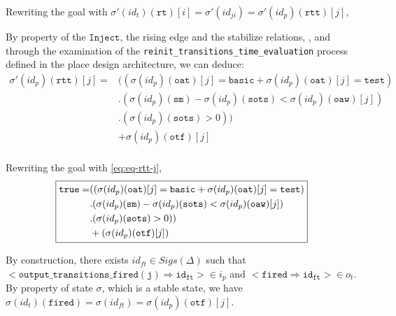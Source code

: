 \documentclass[dvipsnames,12pt]{article}
\begin{document}
\begin{niproof}
\begin{itemize}
\begin{itemize}
      Rewriting the goal with
      $\sigma'(id_t)(\texttt{rt})[i]=\sigma'(id_{ji})=\sigma'(id_p)(\texttt{rtt})[j]$,

      By property of the $\mathtt{Inject}$, the \hvhdl{}
      rising edge and the stabilize relations, \InCsCompP, and through
      the examination of the
      \texttt{reinit_transitions_time_evaluation} process defined in
      the place design architecture, we can deduce:
      \begin{equation}
        \label{eq:eq-rtt-j}
        \begin{split}
          \sigma'(id_p)(\texttt{rtt})[j]=& \big((\sigma(id_p)(\texttt{oat})[j]=\mathtt{basic}+\sigma(id_p)(\texttt{oat})[j]=\mathtt{test}) \\
          & .(\sigma(id_p)(\texttt{sm})-\sigma(id_p)(\texttt{sots})<\sigma(id_p)(\texttt{oaw})[j])\\
          & .(\sigma(id_p)(\texttt{sots})>0)\big)\\
          & +\sigma(id_p)(\texttt{otf})[j] \\
        \end{split}
      \end{equation}

      Rewriting the goal with \eqref{eq:eq-rtt-j},
      \begin{equation*}
        \fbox{$\begin{split}
            \mathtt{true}=& ((\sigma(id_p)(\texttt{oat})[j]=\mathtt{basic}+\sigma(id_p)(\texttt{oat})[j]=\mathtt{test}) \\
            & .(\sigma(id_p)(\texttt{sm})-\sigma(id_p)(\texttt{sots})<\sigma(id_p)(\texttt{oaw})[j])\\
            & .(\sigma(id_p)(\texttt{sots})>0))\\
            & +(\sigma(id_p)(\texttt{otf})[j]) \\
          \end{split}$}
      \end{equation*}

      By construction, there exists $id_{ft}\in{}Sigs(\Delta)$ such that\\
      ${<}\mathtt{output\_transitions\_fired(j)\Rightarrow{}id_{ft}}{>}\in{}i_p$
      and ${<}\mathtt{fired\Rightarrow{}id_{ft}}{>}\in{}o_t$. By
      property of state $\sigma$, which is a stable state, we have
      $\sigma(id_t)(\texttt{fired})=\sigma(id_{ft})=\sigma(id_p)(\texttt{otf})[j]$.


\end{itemize}
\end{itemize}
\end{niproof}
\end{document}
